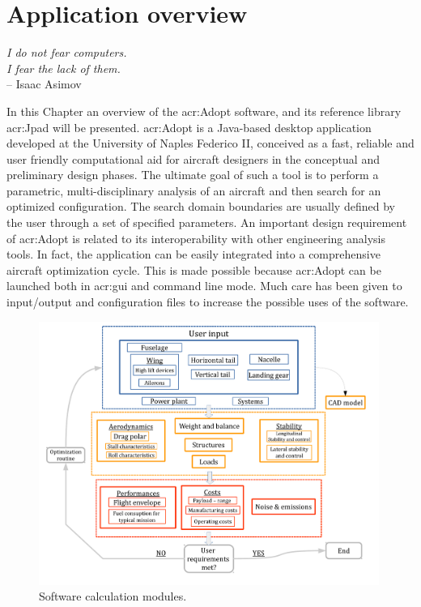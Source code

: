 \chapter{Application overview}
\label{ch:applicationoverview}

\begin{flushright}
	{\smaller
		\textit{I do not fear computers. \\ I fear the lack of them.}\\
		--  Isaac Asimov}
\end{flushright}
In this Chapter an overview of the \gls{acr:Adopt} software, and its reference library \gls{acr:Jpad} will be presented.
\gls{acr:Adopt} is a Java-based desktop application developed at the University of Naples Federico II, conceived as a fast, reliable and user friendly computational aid for aircraft designers in the conceptual and preliminary design phases. The ultimate goal of such a tool is to perform a parametric, multi-disciplinary analysis of an aircraft and then search for an optimized configuration. The search domain boundaries are usually defined by the user through a set of specified parameters. An important design requirement of  \gls{acr:Adopt} is related to its interoperability with other engineering analysis tools. In fact, the application can be easily integrated into a comprehensive aircraft optimization cycle. This is made possible because  \gls{acr:Adopt} can be launched both in \gls{acr:gui} and command line mode. Much care has been given to input/output and configuration files to increase the possible uses of the software.

\begin{figure}[H]
	\centering
	\includegraphics[height = 8.6cm ]{Immagini/flowchart3}
	\caption{Software calculation modules.}
	\label{fig:guiStart}
\end{figure}

